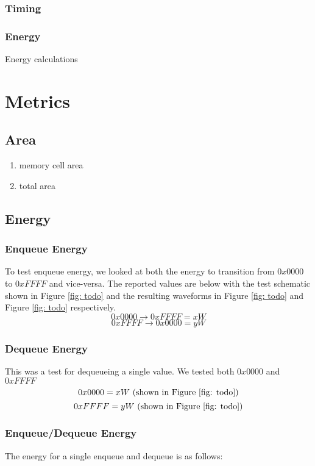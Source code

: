 \documentclass[a4paper]{article}
\begin{document}
\subsubsection{Timing}

\subsubsection{Energy}
Energy calculations



\section{Metrics}
\label{sec:mtrics}

\subsection{Area}
\begin{enumerate}
\item memory cell area
\item total area
\end{enumerate}

\subsection{Energy}
\subsubsection{Enqueue Energy}
To test enqueue energy, we looked at both the energy to transition from $0x0000$ to $0xFFFF$ and vice-versa. The reported values are below with the test schematic shown in Figure \ref{fig: todo} and the resulting waveforms in Figure \ref{fig: todo} and Figure \ref{fig: todo} respectively.
$$0x0000 \rightarrow 0xFFFF = xW$$
$$0xFFFF \rightarrow 0x0000 = yW$$
\subsubsection{Dequeue Energy}
This was a test for dequeueing a single value. We tested both $0x0000$ and $0xFFFF$
$$0x0000 = xW\textnormal{ (shown in Figure \ref{fig: todo})}$$
$$0xFFFF = yW\textnormal{ (shown in Figure \ref{fig: todo})}$$

\subsubsection{Enqueue/Dequeue Energy}
The energy for a single enqueue and dequeue is as follows:
\end{document}
